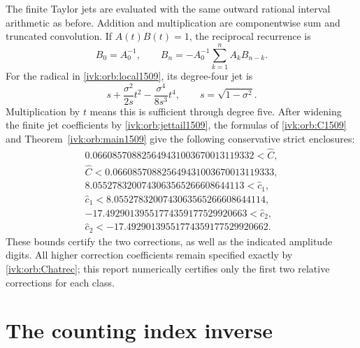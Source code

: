\documentclass[11pt,letterpaper]{article}
\theoremstyle{remark}\newtheorem{remark}[theorem]{Remark}
\begin{document}
The finite Taylor jets are evaluated with the same outward rational
interval arithmetic as before. Addition and multiplication are
componentwise sum and truncated convolution. If $A(t)B(t)=1$,
the reciprocal recurrence is
\[
B_0=A_0^{-1},\qquad
B_n=-A_0^{-1}\sum_{k=1}^{n}A_kB_{n-k}.
\]
For the radical in \eqref{ivk:orb:local1509}, its degree-four jet is
\[
s+\frac{\sigma^2}{2s}t^2-\frac{\sigma^4}{8s^3}t^4,
\qquad s=\sqrt{1-\sigma^2}.
\]
Multiplication by $t$ means this is sufficient through degree five.
After widening the finite jet coefficients by \eqref{ivk:orb:jettail1509},
the formulas of \eqref{ivk:orb:C1509} and Theorem~\ref{ivk:orb:main1509} give the
following conservative strict enclosures:
\begin{equation}\label{ivk:orb:tight1509}
\begin{gathered}
0.066085708825649431003670013119332<\widehat C,\\
\widehat C<0.066085708825649431003670013119333,\\[3pt]
8.0552783200743063565266608644113<\widehat c_1,\\
\widehat c_1<8.0552783200743063565266608644114,\\[3pt]
-17.49290139551774359177529920663<\widehat c_2,\\
\widehat c_2<-17.49290139551774359177529920662.
\end{gathered}
\end{equation}
These bounds certify the two corrections, as well as the indicated
amplitude digits. All higher correction coefficients remain specified
exactly by \eqref{ivk:orb:Chatrec}; this report numerically certifies only the
first two relative corrections for each class.

\section{The counting index inverse}\label{ivk:orb:secinverse}
\end{document}
